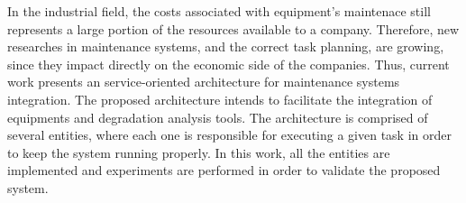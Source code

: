 In the industrial field, the costs associated with equipment's maintenace still represents a large
portion of the resources available to a company. Therefore, new researches in maintenance systems,
and the correct task planning, are growing, since they impact directly on the economic side of the
companies. Thus, current work presents an service-oriented architecture for maintenance systems
integration. The proposed architecture intends to facilitate the integration of equipments and
degradation analysis tools. The architecture is comprised of several entities, where each one is
responsible for executing a given task in order to keep the system running properly. In this work,
all the entities are implemented and experiments are performed in order to validate the proposed
system.
